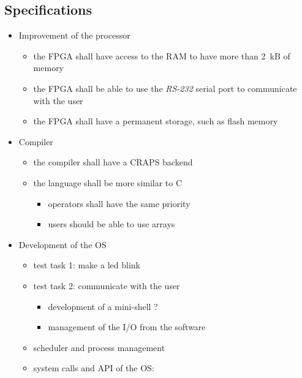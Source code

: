 \documentclass{article}
\begin{document}
  \newpage
  \begin{appendix}
    \section{Specifications}
      \begin{itemize}
        \item Improvement of the processor
          \begin{itemize}
            \item the FPGA shall have access to the RAM to have more than
              \SI{2}{kB} of memory
            \item the FPGA shall be able to use the \textit{RS-232} serial port
              to communicate with the user
            \item the FPGA shall have a permanent storage, such as flash memory
          \end{itemize}
        \item Compiler
          \begin{itemize}
            \item the compiler shall have a CRAPS backend
            \item the language shall be more similar to C
              \begin{itemize}
                \item operators shall have the same priority
                \item users should be able to use arrays
              \end{itemize}
          \end{itemize}
          \item Development of the OS
            \begin{itemize}
              \item test task 1: make a led blink
              \item test task 2: communicate with the user
                \begin{itemize}
                  \item development of a mini-shell ?
                  \item management of the I/O from the software
                \end{itemize}
              \item scheduler and process management
              \item system calls and API of the OS:
                \begin{itemize}

\end{itemize}
\end{itemize}
\end{itemize}
\end{appendix}
\end{document}
